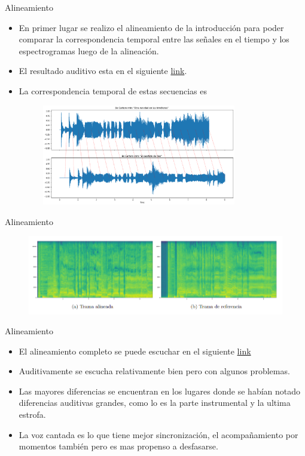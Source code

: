 \documentclass{beamer}
\begin{document}
\begin{frame}{Alineamiento}
\begin{itemize}
    \item En primer lugar se realizo el alineamiento de la introducción para poder comparar la correspondencia temporal entre las señales en el tiempo y los espectrogramas luego de la alineación.
    \item El resultado auditivo esta en el siguiente \href{https://drive.google.com/file/d/1ENzDIU0i8SvjrMq9fPpBsoJTDvhX7c2h/view?usp=sharing}{link}.
    \item La correspondencia temporal de estas secuencias es 
       \begin{figure}
        \centering
        \includegraphics[width=0.8\textwidth]{alineamiento.png}
    \end{figure}
\end{itemize}
    
\end{frame}
\begin{frame}{Alineamiento}
  \begin{figure}
        \centering
        \includegraphics[width=1\textwidth]{espectrogramas.png}
    \end{figure}
\end{frame}
\begin{frame}{Alineamiento}
\begin{itemize}
    \item El alineamiento completo se puede escuchar en el siguiente \href{https://drive.google.com/file/d/1xiB5YNNIlJ8gaIPRDziwazqU-TdGHNDC/view?usp=sharing}{link}
    \item Auditivamente se escucha relativamente bien pero con algunos problemas.
    \item Las mayores diferencias se encuentran en los lugares donde se habían notado diferencias auditivas grandes, como lo es la parte instrumental y la ultima estrofa.
    \item La voz cantada es lo que tiene mejor sincronización, el acompañamiento por momentos también pero es mas propenso a desfasarse. 
    \end{itemize}
\end{frame}
\end{document}
